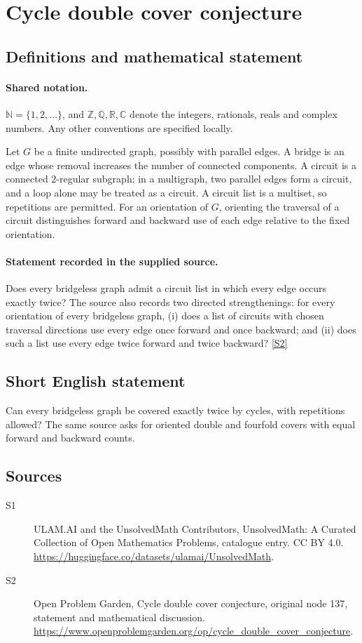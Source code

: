 \documentclass[11pt]{article}
\newcommand{\sref}[2]{\hyperlink{source:#1:#2}{[S#2]}}
\begin{document}
\section{Cycle double cover conjecture}\label{statement}

\subsection{Definitions and mathematical statement}

\paragraph{Shared notation.}$\mathbb N=\{1,2,\ldots\}$, and $\mathbb Z,\mathbb Q,\mathbb R,\mathbb C$ denote the integers, rationals, reals and complex numbers. Any other conventions are specified locally.


Let $G$ be a finite undirected graph, possibly with parallel edges. A bridge is an edge whose removal increases the number of connected components. A circuit is a connected $2$-regular subgraph; in a multigraph, two parallel edges form a circuit, and a loop alone may be treated as a circuit. A circuit list is a multiset, so repetitions are permitted. For an orientation of $G$, orienting the traversal of a circuit distinguishes forward and backward use of each edge relative to the fixed orientation.
\paragraph{Statement recorded in the supplied source.}
Does every bridgeless graph admit a circuit list in which every edge occurs exactly twice? The source also records two directed strengthenings: for every orientation of every bridgeless graph, (i) does a list of circuits with chosen traversal directions use every edge once forward and once backward; and (ii) does such a list use every edge twice forward and twice backward? \sref{statement}{2}
\subsection{Short English statement}
Can every bridgeless graph be covered exactly twice by cycles, with repetitions allowed? The same source asks for oriented double and fourfold covers with equal forward and backward counts.
\subsection{Sources}
\begin{description}
\item[\hypertarget{source:statement:1}{S1}] ULAM.AI and the UnsolvedMath Contributors, UnsolvedMath: A Curated Collection of Open Mathematics Problems, catalogue entry. CC BY 4.0. \url{https://huggingface.co/datasets/ulamai/UnsolvedMath}.
\item[\hypertarget{source:statement:2}{S2}] Open Problem Garden, Cycle double cover conjecture, original node 137, statement and mathematical discussion. \url{https://www.openproblemgarden.org/op/cycle_double_cover_conjecture}.
\end{description}
\label{end:statement}
\end{document}
